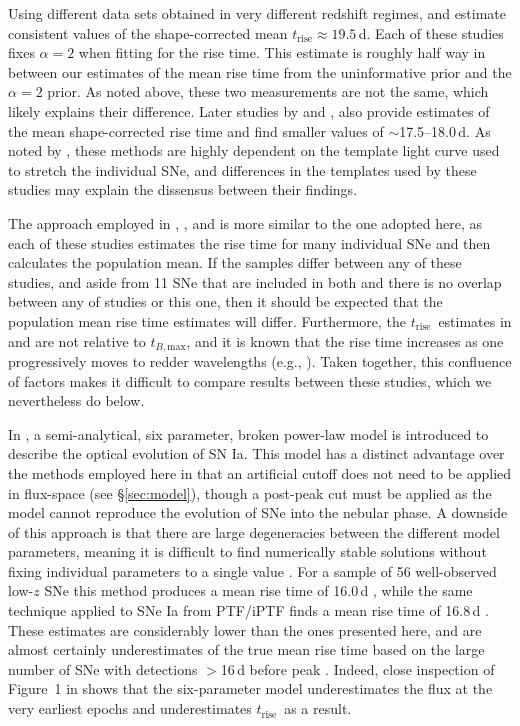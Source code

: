 \documentclass[twocolumn]{./aastex63}
\newcommand{\trise}{$t_\mathrm{rise}$}
\newcommand{\tbmax}{$t_{B,\mathrm{max}}$}
\begin{document}
Using different data sets obtained in very different redshift regimes,
\citet{Riess99a} and \citet{Conley06} estimate consistent values of the
shape-corrected mean \trise$ \approx 19.5$\,d. Each of these studies fixes
$\alpha = 2$ when fitting for the rise time. This estimate is roughly half way
in between our estimates of the mean rise time from the uninformative prior and
the $\alpha = 2$ prior. As noted above, these two measurements are not the same,
which likely explains their difference. Later studies by \citet{Hayden10} and
\citet{Ganeshalingam11}, also provide estimates of the mean shape-corrected rise
time and find smaller values of $\sim$17.5--18.0\,d. As noted by
\citeauthor{Hayden10}, these methods are highly dependent on the template light
curve used to stretch the individual SNe, and differences in the templates
used by these studies may explain the dissensus between their findings.


The approach employed in \citet{Zheng17a}, \citet{Papadogiannakis19}, and
\citet{Firth15} is more similar to the one adopted here, as each of these
studies estimates the rise time for many individual SNe and then calculates the
population mean. If the samples differ between any of these studies, and aside
from 11 SNe that are included in both \citet{Papadogiannakis19} and
\citet{Firth15} there is no overlap between any of studies or this one, then it
should be expected that the population mean rise time estimates will differ.
Furthermore, the \trise\ estimates in \citet{Papadogiannakis19} and
\citet{Firth15} are not relative to \tbmax, and it is known that the rise time
increases as one progressively moves to redder wavelengths (e.g.,
\citealt{Ganeshalingam11}). Taken together, this confluence of factors makes it
difficult to compare results between these studies, which we nevertheless do
below.

In \citet{Zheng17}, a semi-analytical, six parameter, broken power-law model is
introduced to describe the optical evolution of SN Ia. This model has a distinct
advantage over the methods employed here in that an artificial cutoff does not
need to be applied in flux-space (see \S\ref{sec:model}), though a post-peak cut
must be applied as the model cannot reproduce the evolution of SNe into the
nebular phase. A downside of this approach is that there are large degeneracies
between the different model parameters, meaning it is difficult to find
numerically stable solutions without fixing individual parameters to a single
value \citep{Zheng17a}. For a sample of 56 well-observed low-$z$ SNe this method
produces a mean rise time of 16.0\,d \citep{Zheng17a}, while the same technique
applied to SNe Ia from PTF/iPTF finds a mean rise time of 16.8\,d
\citep{Papadogiannakis19}. These estimates are considerably lower than the ones
presented here, and are almost certainly underestimates of the true mean rise
time based on the large number of SNe with detections $>$16\,d before peak
\citep{Papadogiannakis19, Yao19}. Indeed, close inspection of Figure~1 in
\citet{Zheng17a} shows that the six-parameter model underestimates the flux at
the very earliest epochs and underestimates \trise\ as a result.
\end{document}
